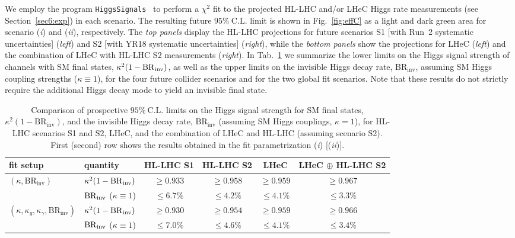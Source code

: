 \documentclass[../report.tex]{subfiles}
\begin{document}
We employ the program \texttt{HiggsSignals}~\cite{Bechtle:2013xfa,Bechtle:2014ewa} to perform a $\chi^2$ fit to the projected HL-LHC {and/or LHeC} Higgs rate measurements (see Section~\ref{sec6:exp})  in each scenario. The resulting future $95\%~\mathrm{C.L.}$ limit is shown in Fig.~\ref{fig:effC} as a light and dark green area for scenario (\emph{i}) and (\emph{ii}), respectively. {The \emph{top panels} display the HL-LHC projections for future scenarios S1 [with Run~2 systematic uncertainties] (\emph{left}) and S2 [with YR18 systematic uncertainties] (\emph{right}), while the \emph{bottom panels} show the projections for LHeC (\emph{left}) and the combination of LHeC with HL-LHC S2 measurements (\emph{right}).} {In Tab.~\ref{tab:effC_limits} we summarize the lower limits on the Higgs signal strength of channels with SM final states, $\kappa^2 (1-\mathrm{BR}_\mathrm{inv})$, as well as the upper limits on the invisible Higgs decay rate, $\mathrm{BR}_\text{inv}$, assuming SM Higgs coupling strengths ($\kappa \equiv 1$), for the four future collider scenarios and for the two global fit scenarios.} Note that these results do not strictly require the additional Higgs decay mode to yield an invisible final state.

\begin{table}
\centering
\begin{tabular}{ l |  l | cccc}
\hline
fit setup &  quantity   & HL-LHC S1   & HL-LHC S2   & LHeC	  & LHeC $\oplus$ HL-LHC S2 \\
\hline
\multirow{2}{*}{$(\kappa, \mathrm{BR}_\text{inv})$}                         &  $\kappa^2 (1-\mathrm{BR}_\mathrm{inv})$ &  $\ge 0.933$ & $\ge 0.958$ & $\ge 0.959$  & $\ge 0.967$ \\
                                                                            &  $\mathrm{BR}_\mathrm{inv}$ ($\kappa\equiv 1$) & $\le 6.7\%$ & $\le 4.2\% $ & $\le 4.1\%$ & $\le 3.3\%$\\
\hline									  
\multirow{2}{*}{$(\kappa, \kappa_g, \kappa_\gamma,  \mathrm{BR}_\text{inv})$}   &  $\kappa^2 (1-\mathrm{BR}_\mathrm{inv})$ & $\ge0.930$ &  $\ge0.954$ & $\ge0.959$ & $\ge0.966$\\
                                                                                &   $\mathrm{BR}_\mathrm{inv}$ ($\kappa\equiv 1$) & $\le7.0\%$ & $\le4.6\%$ & $\le4.1\%$ & $\le3.4\%$\\

\hline
\end{tabular}
\caption{{Comparison of prospective $95\%~\mathrm{C.L.}$ limits on the Higgs signal strength for SM final states, $\kappa^2(1-\mathrm{BR}_\text{inv})$, and the invisible Higgs decay rate, $\mathrm{BR}_\text{inv}$ (assuming SM Higgs couplings, $\kappa =1$), for HL-LHC scenarios S1 and S2, LHeC, and the combination of LHeC and HL-LHC (assuming scenario S2). First (second) row shows the results obtained in the fit parametrization (\emph{i}) [(\emph{ii})].}}
\label{tab:effC_limits}
\end{table}
\end{document}
